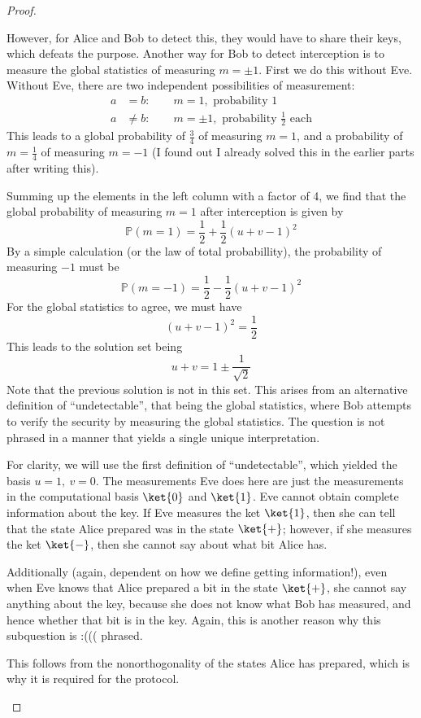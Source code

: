 \begin{proof}
\begin{parts}
		However, for Alice and Bob to detect this, they would have to share their keys, which defeats the purpose. Another way for Bob to detect interception is to measure the global statistics of measuring $m=\pm 1$. First we do this without Eve. Without Eve, there are two independent possibilities of measurement:
		\begin{align*}
			a &= b:\qquad m=1,\text{ probability 1}\\
			a&\neq b:\qquad m=\pm 1, \text{ probability }\frac 12\text{ each}
		\end{align*}
		This leads to a global probability of $\frac 34$ of measuring $m=1$, and a probability of $m=\frac 14$ of measuring $m=-1$ (I found out I already solved this in the earlier parts after writing this).
		
		Summing up the elements in the left column with a factor of 4, we find that the global probability of measuring $m=1$ after interception is given by
		\[\mathbb{P}(m=1) = \frac 12 + \frac 12 (u+v-1)^2\]
		By a simple calculation (or the law of total probabillity), the probability of measuring $-1$ must be
		\[\mathbb{P}(m=-1) =  \frac 12 - \frac 12 (u+v-1)^2\]
		For the global statistics to agree, we must have
		\[(u+v-1)^2 = \frac 12\]
		This leads to the solution set being
		\[u+v = 1\pm \frac{1}{\sqrt{2}}\]
		Note that the previous solution is not in this set. This arises from an alternative definition of ``undetectable'', that being the global statistics, where Bob attempts to verify the security by measuring the global statistics. The question is not phrased in a manner that yields a single unique interpretation.
		\item For clarity, we will use the first definition of ``undetectable'', which yielded the basis $u=1,~v=0$. The measurements Eve does here are just the measurements in the computational basis $\ket{0}$ and $\ket{1}$. Eve cannot obtain complete information about the key. If Eve measures the ket $\ket{1}$, then she can tell that the state Alice prepared was in the state $\ket{+}$; however, if she measures the ket $\ket{-}$, then she cannot say about what bit Alice has. 
		
		Additionally (again, dependent on how we define getting information!), even when Eve knows that Alice prepared a bit in the state $\ket{+}$, she cannot say anything about the key, because she does not know what Bob has measured, and hence whether that bit is in the key. Again, this is another reason why this subquestion is :((( phrased.
		
		This follows from the nonorthogonality of the states Alice has prepared, which is why it is required for the protocol.\qedhere

	\end{parts}
\end{proof}
